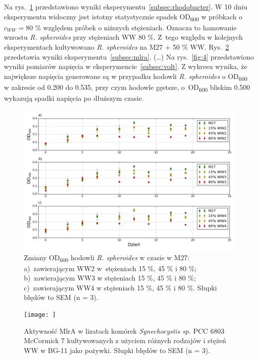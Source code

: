 Na rys.~\ref{fig:2} przedstawiono wyniki
eksperymentu~\ref{subsec:rhodobacter}.
W 10 dniu eksperymentu widoczny jest istotny
statystycznie spadek OD\textsubscript{600}
w próbkach o $c_{WW} = 80$ \% względem próbek
o niższych stężeniach.
Oznacza to hamowanie wzrostu \textit{R. spheroides}
przy stężeniach WW 80 \%.
Z~tego względu w kolejnych eksperymentach kultywowano
\textit{R. spheroides} na M27 + 50 \% WW\@.
Rys.~\ref{fig:3} przedstawia wyniki
eksperymentu~\ref{subsec:mlra}.
(\ldots)
Na rys.~\ref{fig:4} przedstawiono wyniki pomiarów
napięcia w eksperymencie~\ref{subsec:volt}.
Z wykresu wynika, że największe napięcia generowane
są w przypadku hodowli \textit{R. spheroides}
o OD\textsubscript{600} w zakresie od 0.200 do 0.535,
przy czym hodowle gęstsze, o~OD\textsubscript{600} bliskim
0.500 wykazują spadki napięcia po dłuższym czasie.

\begin{figure}[t]
    \centering
    \includegraphics[width=14cm]{figures/ww}
    \caption{
        Zmiany OD\textsubscript{600} hodowli \textit{R. spheroides} w czasie w M27:
        a)~zawierającym WW2 w~stężeniach 15 \%, 45 \% i 80 \%;
        b)~zawierającym WW3 w stężeniach 15 \%, 45 \% i 80 \%;
        c)~zawierającym WW4 w stężeniach 15 \%, 45 \% i 80 \%.
        Słupki błędów to SEM (n = 3).
    }
    \label{fig:2}
\end{figure}

\begin{figure}
    \centering
    \texttt{[image: ]}
    \caption{
        Aktywność MlrA w lizatach komórek
        \textit{Synechocystis sp.} PCC 6803 McCormick 7
        kultywowanych z użyciem różnych rodzajów i stężeń WW
        w BG-11 jako pożywki. Słupki błędów to SEM (n = 3).
    }
    \label{fig:3}
\end{figure}

